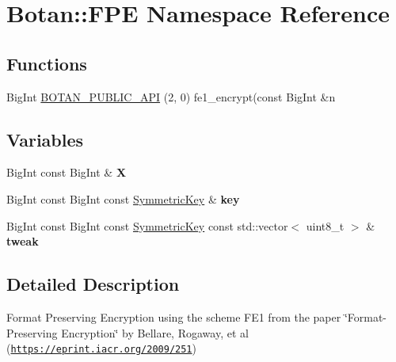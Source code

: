 \hypertarget{namespace_botan_1_1_f_p_e}{}\section{Botan\+:\+:F\+PE Namespace Reference}
\label{namespace_botan_1_1_f_p_e}
\subsection*{Functions}
\begin{DoxyCompactItemize}
\item 
Big\+Int \hyperlink{namespace_botan_1_1_f_p_e_a29bb20fba3a1a40fd254e35b113c17df}{B\+O\+T\+A\+N\+\_\+\+P\+U\+B\+L\+I\+C\+\_\+\+A\+PI} (2, 0) fe1\+\_\+encrypt(const Big\+Int \&n
\end{DoxyCompactItemize}
\subsection*{Variables}
\begin{DoxyCompactItemize}
\item 
\mbox{\label{namespace_botan_1_1_f_p_e_a2b5c354a6252509808ecb5579215c121}} 
Big\+Int const Big\+Int \& {\bfseries X}
\item 
\mbox{\label{namespace_botan_1_1_f_p_e_a9df28a11971cf39beed323e21763a95b}} 
Big\+Int const Big\+Int const \hyperlink{namespace_botan_a89cf6c3513428f524454d01830221a88}{Symmetric\+Key} \& {\bfseries key}
\item 
\mbox{\label{namespace_botan_1_1_f_p_e_a847fa048d8e934a132e9daf17e589b21}} 
Big\+Int const Big\+Int const \hyperlink{namespace_botan_a89cf6c3513428f524454d01830221a88}{Symmetric\+Key} const std\+::vector$<$ uint8\+\_\+t $>$ \& {\bfseries tweak}
\end{DoxyCompactItemize}


\subsection{Detailed Description}
Format Preserving Encryption using the scheme F\+E1 from the paper \char`\"{}\+Format-\/\+Preserving Encryption\char`\"{} by Bellare, Rogaway, et al (\href{https://eprint.iacr.org/2009/251}{\tt https\+://eprint.\+iacr.\+org/2009/251}) 

